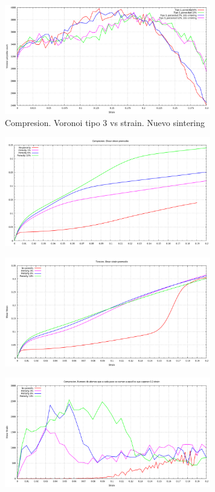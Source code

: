 \documentclass[10pt, oneside]{article} %
\begin{document}
\begin{figure}[H]
\centering
\includegraphics[width=9cm]{Figures/Porosidad/Porosidad_newSinter_voronoi3.png}
\caption{Compresion. Voronoi tipo 3 vs strain. Nuevo sintering}
\end{figure}

\begin{figure}[H]
\centering
\includegraphics[width=9cm]{Figures/Porosidad/Porosidad_ss_1.png}
\caption{}
\end{figure}

\begin{figure}[H]
\centering
\includegraphics[width=9cm]{Figures/Porosidad/Porosidad_ss_2.png}
\caption{}
\end{figure}

\begin{figure}[H]
\centering
\includegraphics[width=9cm]{Figures/Porosidad/Porosidad_ss_3.png}
\caption{}
\end{figure}
\end{document}
